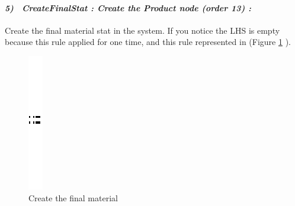 \paragraph{\emph{5)~ CreateFinalStat : Create the Product node (order 13) :} }
Create the final material stat in the system. If you notice the LHS is empty because this rule applied for one time, and this rule represented in 
(Figure \ref{fig:Create the final material} ).
 
\begin{figure}[th]
\centering
	\quad{}
		\includegraphics{ch3/img/sep}
	\quad{}
\caption{\label{fig:Create the final material}Create the final material}
 
\end{figure} 
\pagebreak
